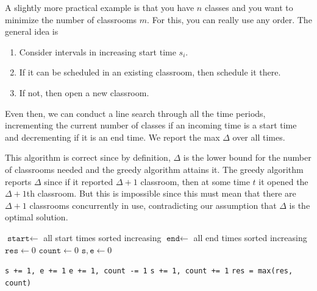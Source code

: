   \begin{example}
    \label{ex:classroom-scheduling}
    A slightly more practical example is that you have $n$ classes and you want to minimize the number of classrooms $m$. For this, you can really use any order. The general idea is 
    \begin{enumerate}
      \item Consider intervals in increasing start time $s_i$. 
      \item If it can be scheduled in an existing classroom, then schedule it there. 
      \item If not, then open a new classroom. 
    \end{enumerate}
    Even then, we can conduct a line search through all the time periods, incrementing the current number of classes if an incoming time is a start time and decrementing if it is an end time. We report the max $\Delta$ over all times. 

    This algorithm is correct since by definition, $\Delta$ is the lower bound for the number of classrooms needed and the greedy algorithm attains it. The greedy algorithm reports $\Delta$ since if it reported $\Delta +1$ classroom, then at some time $t$ it opened the $\Delta+1$th classroom. But this is impossible since this must mean that there are $\Delta + 1$ classrooms concurrently in use, contradicting our assumption that $\Delta$ is the optimal solution. 

    \begin{algorithm}[H]
      \caption{Minimizing Number of Rooms With $n$ Classes (Leetcode 253, Meeting Rooms II)}
      \label{alg:class_schedule}
      \begin{algorithmic}
          \State $\texttt{start} \gets$ all start times sorted increasing 
          \State $\texttt{end} \gets$ all end times sorted increasing 
          \State $\texttt{res} \gets 0$  
          \State $\texttt{count} \gets 0$  
          \State $\texttt{s}, \texttt{e} \gets 0$  

           
             
              \State \texttt{s += 1, e += 1} 
              \State \texttt{e += 1, count -= 1} 
              \State \texttt{s += 1, count += 1} 
              \State \texttt{res = max(res, count)} 
            \EndIf
          \EndWhile


\end{algorithmic}
\end{algorithm}
\end{example}
